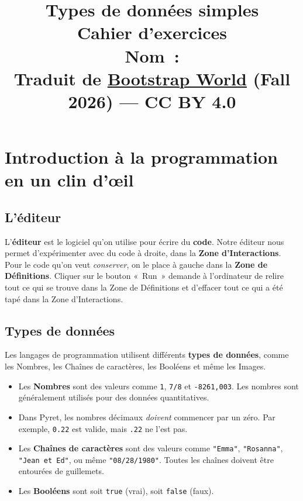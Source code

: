 \documentclass[12pt,a4paper]{article}
\title{%
  {\Huge\bfseries Types de données simples}\\[0.5em]
  {\Large Cahier d'exercices}\\[1em]
  {\normalsize Nom~: \makebox[6cm]{\dotfill}}\\[0.5em]
  {\normalsize Traduit de \href{https://www.bootstrapworld.org/}{Bootstrap World} (Fall 2026) — CC BY 4.0}
}
\date{}
\author{}
\newcommand{\pyret}[1]{\texttt{#1}}
\begin{document}
\maketitle
\thispagestyle{empty}

\newpage

\section*{Introduction à la programmation en un clin d'œil}

\subsection*{L'éditeur}

L'\textbf{éditeur} est le logiciel qu'on utilise pour écrire du \textbf{code}. Notre éditeur nous permet d'expérimenter avec du code à droite, dans la \textbf{Zone d'Interactions}. Pour le code qu'on veut \emph{conserver}, on le place à gauche dans la \textbf{Zone de Définitions}. Cliquer sur le bouton «~Run~» demande à l'ordinateur de relire tout ce qui se trouve dans la Zone de Définitions et d'effacer tout ce qui a été tapé dans la Zone d'Interactions.

\subsection*{Types de données}

Les langages de programmation utilisent différents \textbf{types de données}, comme les Nombres, les Chaînes de caractères, les Booléens et même les Images.

\begin{itemize}
  \item Les \textbf{Nombres} sont des valeurs comme \pyret{1}, \pyret{7/8} et \pyret{-8261,003}. Les nombres sont généralement utilisés pour des données quantitatives.
  \item Dans Pyret, les nombres décimaux \emph{doivent} commencer par un zéro. Par exemple, \pyret{0.22} est valide, mais \pyret{.22} ne l'est pas.
  \item Les \textbf{Chaînes de caractères} sont des valeurs comme \pyret{"Emma"}, \pyret{"Rosanna"}, \pyret{"Jean et Ed"}, ou même \pyret{"08/28/1980"}. Toutes les chaînes doivent être entourées de guillemets.
  \item Les \textbf{Booléens} sont soit \pyret{true} (vrai), soit \pyret{false} (faux).
\end{itemize}
\end{document}
